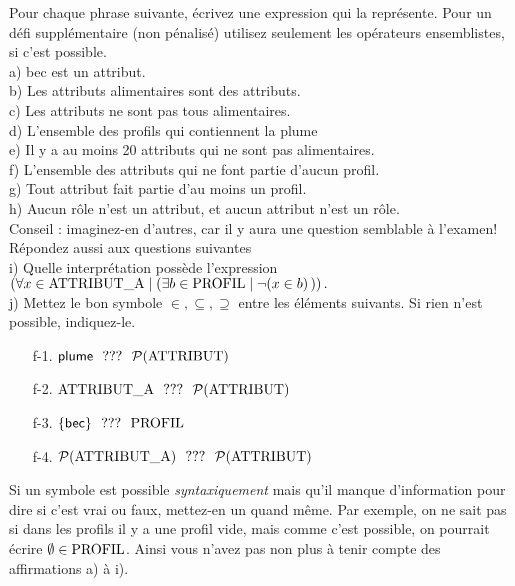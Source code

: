 \documentclass[12pt]{article}
\newcommand{\dans}{\in}                  %
\begin{document}
Pour chaque phrase suivante, écrivez une expression qui la représente. Pour un défi supplémentaire (non pénalisé) utilisez seulement les opérateurs ensemblistes, si c’est possible. 
\\[2mm]
a) \textsf{bec} est un attribut.\\[2mm]
b) Les attributs alimentaires sont des attributs.\\[2mm]
c) Les attributs ne sont pas tous alimentaires.\\[2mm]
d) L'ensemble des profils qui contiennent  la \textsf{plume}\\[2mm]
 e) Il y a au moins 20 attributs qui ne sont pas alimentaires.\\[2mm]
 f) L'ensemble des attributs qui ne font partie d'aucun profil.\\[2mm]
 g)  Tout attribut fait partie d'au moins un profil.\\[2mm]
h) Aucun rôle n'est un attribut, et aucun attribut n'est un rôle.
 \\Conseil : imaginez-en d'autres, car il y aura une question semblable à l'examen! \\[3mm]
 Répondez aussi aux questions suivantes\\[2mm]
i) 
Quelle interprétation possède l'expression \\\mbox{}\hfill$(\forall x \dans \attributn \mid (\exists b\in \profil\mid  \neg(x\in b) \,) )\,.$\hfill\mbox{}
 \\[3mm]
j) Mettez le bon symbole $\in,\subseteq, \supseteq$  entre les éléments suivants. Si rien n’est possible, indiquez-le. \\[-3mm]
\begin{itemize}
\item[f-1.] $\textsf{plume} ~~???~~ \mathcal{P}(\mbox{ATTRIBUT})$
\item[f-2.] $\mbox{ATTRIBUT\_A}~~???~~ \mathcal{P}(\mbox{ATTRIBUT})$
\item[f-3.] $\{\textsf{bec}\}~~???~~\mbox{PROFIL}$
\item[f-4.] $\mathcal{P}(\mbox{ATTRIBUT\_A}) ~~???~~ \mathcal{P}(\mbox{ATTRIBUT})$
\end{itemize}
Si un symbole est possible \emph{syntaxiquement} mais qu'il manque d'information pour dire si c'est vrai ou faux,   mettez-en un quand même. Par exemple, on ne sait pas si dans les profils il y a une profil vide, mais comme c'est possible, on pourrait  écrire $\emptyset\in\mbox{PROFIL}$. Ainsi vous n'avez pas non plus à tenir compte des affirmations a) à i).
\end{document}

